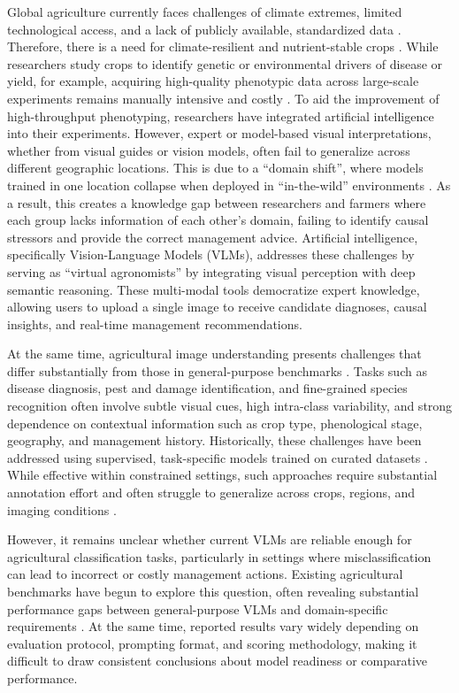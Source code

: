 \documentclass[10pt,letterpaper]{article}
\begin{document}
Global agriculture currently faces challenges of climate extremes, limited technological access, and a lack of publicly available, standardized data \cite{aijaz_artificial_2025}. Therefore, there is a need for climate-resilient and nutrient-stable crops \cite{berlingeri_integration_2025}. While researchers study crops to identify genetic or environmental drivers of disease or yield, for example, acquiring high-quality phenotypic data across large-scale experiments remains manually intensive and costly \cite{reynolds_what_2019}. To aid the improvement of high-throughput phenotyping, researchers have integrated artificial intelligence into their experiments. However, expert or model-based visual interpretations, whether from visual guides or vision models, often fail to generalize across different geographic locations. This is due to a “domain shift”, where models trained in one location collapse when deployed in “in-the-wild” environments \cite{hu_domain_2025}. As a result, this creates a knowledge gap between researchers and farmers where each group lacks information of each other's domain, failing to identify causal stressors and provide the correct management advice. Artificial intelligence, specifically Vision-Language Models (VLMs), addresses these challenges by serving as “virtual agronomists” by integrating visual perception with deep semantic reasoning. These multi-modal tools democratize expert knowledge, allowing users to upload a single image to receive candidate diagnoses, causal insights, and real-time management recommendations.

At the same time, agricultural image understanding presents challenges that differ substantially from those in general-purpose benchmarks \cite{huang_evaluating_2025}. Tasks such as disease diagnosis, pest and damage identification, and fine-grained species recognition often involve subtle visual cues, high intra-class variability, and strong dependence on contextual information such as crop type, phenological stage, geography, and management history. Historically, these challenges have been addressed using supervised, task-specific models trained on curated datasets \cite{kamilaris_deep_2018}. While effective within constrained settings, such approaches require substantial annotation effort and often struggle to generalize across crops, regions, and imaging conditions \cite{magistri_one_2023, zhang_unsupervised_2022, yang_enhancing_2025}.

However, it remains unclear whether current VLMs are reliable enough for agricultural classification tasks, particularly in settings where misclassification can lead to incorrect or costly management actions. Existing agricultural benchmarks have begun to explore this question, often revealing substantial performance gaps between general-purpose VLMs and domain-specific requirements \cite{joshi_standardizing_2023, arshad_leveraging_2025, shinoda_agrobench_2025}. At the same time, reported results vary widely depending on evaluation protocol, prompting format, and scoring methodology, making it difficult to draw consistent conclusions about model readiness or comparative performance.
\end{document}
